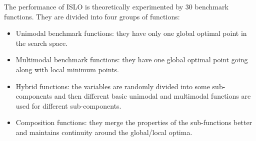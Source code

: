 \documentclass[a4paper,13pt,2p]{report}
\begin{document}
	The performance of ISLO is theoretically experimented by 30 benchmark functions. They are divided into four groups of functions:
\begin{itemize}
\item Unimodal benchmark functions: they have only one global optimal point in the search space.
\item Multimodal benchmark functions: they have one global optimal point going along with local minimum points.
\item Hybrid functions:  the variables are
randomly divided into some sub-components and then different basic unimodal and multimodal functions are used for different sub-components.
\item Composition functions: they merge the properties of the sub-functions better and maintains continuity around the global/local optima. 
\end{itemize}
\end{document}

